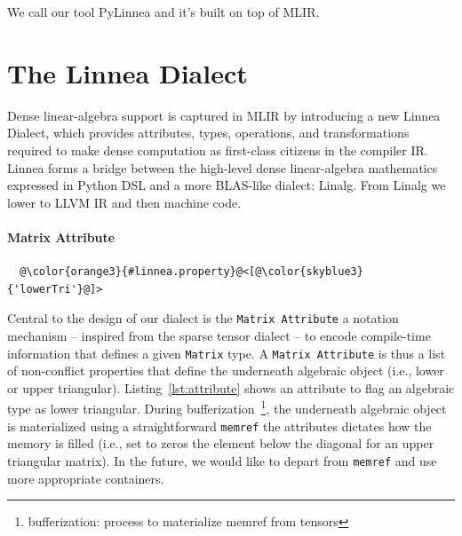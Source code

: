 \documentclass[conference]{IEEEtran}
\begin{document}
We call our tool PyLinnea and it's built on top of MLIR.

\section{The Linnea Dialect}

Dense linear-algebra support is captured in MLIR by introducing a new Linnea
Dialect, which provides attributes, types, operations, and transformations
required to make dense computation as first-class citizens in the compiler IR.
Linnea forms a bridge between the high-level dense linear-algebra mathematics
expressed in Python DSL and a more BLAS-like dialect: Linalg. From Linalg we lower
to LLVM IR and then machine code.

\paragraph{Matrix Attribute}

\begin{listing}[]
\begin{center}
\begin{minipage}[]{0.5\textwidth}
\begin{verbatim}
  @\color{orange3}{#linnea.property}@<[@\color{skyblue3}{'lowerTri'}@]>
\end{verbatim}
\end{minipage}
\caption{Linnea attributes attach properties to the underneath algebraic object.}
\label{lst:attribute}
\end{center}
\end{listing}

Central to the design of our dialect is the \texttt{Matrix Attribute} a
notation mechanism -- inspired from the sparse tensor dialect -- to encode
compile-time information that defines a given \texttt{Matrix} type. A
\texttt{Matrix Attribute} is thus a list of non-conflict properties that define
the underneath algebraic object (i.e., lower or upper triangular).
Listing~\ref{lst:attribute} shows an attribute to flag an algebraic type as
lower triangular. During bufferization~\footnote{bufferization: process to
materialize memref from tensors}, the underneath algebraic object is
materialized using a straightforward \texttt{memref} the attributes dictates
how the memory is filled (i.e., set to zeros the element below the diagonal for
an upper triangular matrix). In the future, we would like to depart from
\texttt{memref} and use more appropriate containers.
\end{document}
